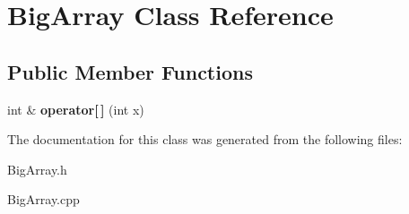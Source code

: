 \hypertarget{class_big_array}{}\section{Big\+Array Class Reference}
\label{class_big_array}
\subsection*{Public Member Functions}
\begin{DoxyCompactItemize}
\item 
\mbox{\label{class_big_array_ad28141ac2190118ecad627febce2269e}} 
int \& {\bfseries operator\mbox{[}$\,$\mbox{]}} (int x)
\end{DoxyCompactItemize}


The documentation for this class was generated from the following files\+:\begin{DoxyCompactItemize}
\item 
Big\+Array.\+h\item 
Big\+Array.\+cpp\end{DoxyCompactItemize}
